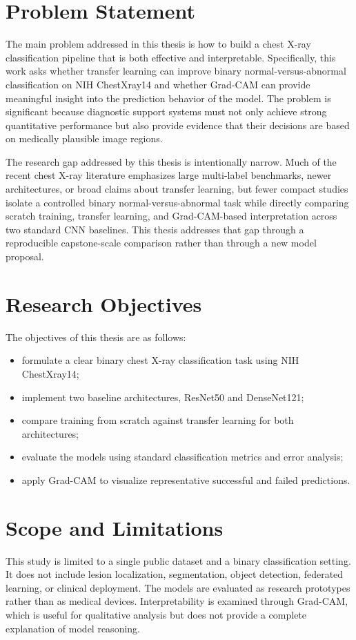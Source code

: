 \section{Problem Statement}
The main problem addressed in this thesis is how to build a chest X-ray classification pipeline that is both effective and interpretable. Specifically, this work asks whether transfer learning can improve binary normal-versus-abnormal classification on NIH ChestXray14 and whether Grad-CAM can provide meaningful insight into the prediction behavior of the model. The problem is significant because diagnostic support systems must not only achieve strong quantitative performance but also provide evidence that their decisions are based on medically plausible image regions.

The research gap addressed by this thesis is intentionally narrow. Much of the recent chest X-ray literature emphasizes large multi-label benchmarks, newer architectures, or broad claims about transfer learning, but fewer compact studies isolate a controlled binary normal-versus-abnormal task while directly comparing scratch training, transfer learning, and Grad-CAM-based interpretation across two standard CNN baselines. This thesis addresses that gap through a reproducible capstone-scale comparison rather than through a new model proposal.

\section{Research Objectives}
The objectives of this thesis are as follows:
\begin{itemize}
    \item formulate a clear binary chest X-ray classification task using NIH ChestXray14;
    \item implement two baseline architectures, ResNet50 and DenseNet121;
    \item compare training from scratch against transfer learning for both architectures;
    \item evaluate the models using standard classification metrics and error analysis;
    \item apply Grad-CAM to visualize representative successful and failed predictions.
\end{itemize}

\section{Scope and Limitations}
This study is limited to a single public dataset and a binary classification setting. It does not include lesion localization, segmentation, object detection, federated learning, or clinical deployment. The models are evaluated as research prototypes rather than as medical devices. Interpretability is examined through Grad-CAM, which is useful for qualitative analysis but does not provide a complete explanation of model reasoning.

